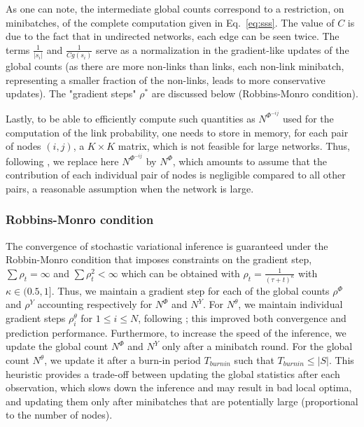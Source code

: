 %
As one can note, the intermediate global counts correspond to a restriction, on minibatches, of the complete computation given in Eq.~\ref{eq:sss}. The value of $C$ is due to the fact that in undirected networks, each edge can be seen twice. The terms $\frac{1}{|s_i|}$ and $\frac{1}{Cg(s_i)}$ serve as a normalization in the gradient-like updates of the global counts (as there are more non-links than links, each non-link minibatch, representing a smaller fraction of the non-links, leads to more conservative updates). The "gradient steps" $\rho^*$ are discussed below (Robbins-Monro condition).

Lastly, to be able to efficiently compute such quantities as $N^{\Phi^{-ij}}$ used for the computation of the link probability, one needs to store in memory, for each pair of nodes $(i,j)$, a $K \times K$ matrix, which is not feasible for large networks. Thus, following \cite{foulds2013stochastic}, we replace here $N^{\Phi^{-ij}}$ by $N^{\Phi}$, which amounts to assume that the contribution of each individual pair of nodes is negligible compared to all other pairs, a reasonable assumption when the network is large. %

\subsubsection{Robbins-Monro condition} 

\begin{table*}[t]
\bgroup
\def\arraystretch{1} %
	
\egroup
\label{table:corpus}
\end{table*}

The convergence of stochastic variational inference is guaranteed under the Robbin-Monro condition \cite{robbins1951stochastic} that imposes constraints on the gradient step, $\sum \rho_t = \infty$ and $\sum \rho_t^2 < \infty$ which can be obtained with $\rho_t = \frac{1}{(\tau +t)^\kappa}$ with $\kappa \in (0.5, 1]$. Thus, we maintain a gradient step for each of the global counts $\rho^\Phi$ and $\rho^{Y}$ accounting respectively for  $N^\Phi$ and $N^{Y}$. For $N^\theta$, we maintain individual gradient steps $\rho_i^{\theta}$ for $1\leq i\leq N$, following \cite{miller2009nonparametric}; this improved both convergence and prediction performance. Furthermore, to increase the speed of the inference, we update the global count $N^\Phi$ and $N^{Y}$ only after a minibatch round. For the global count  $N^\theta$, we update it after a burn-in period $T_{burnin}$ such that $T_{burnin} \leq |S|$.
This heuristic provides a trade-off between updating the global statistics after each observation, which slows down the inference and may result in bad local optima, and updating them only after minibatches that are potentially large (proportional to the number of nodes).

